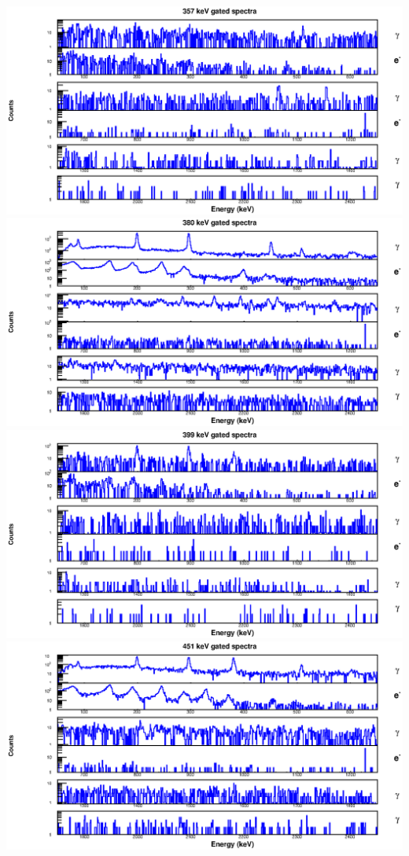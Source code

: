 \begin{landscape}
\includegraphics[scale=1.2]{156Gd_Appendix/357_combined.eps}
\includegraphics[scale=1.2]{156Gd_Appendix/380_combined.eps}
\includegraphics[scale=1.2]{156Gd_Appendix/399_combined.eps}
\includegraphics[scale=1.2]{156Gd_Appendix/451_combined.eps}

\end{landscape}
